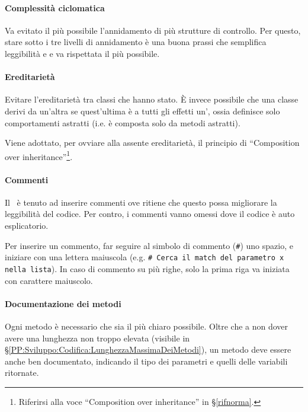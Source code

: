         \paragraph{Complessità ciclomatica}\label{PP:Sviluppo:Codifica:ComplessitàCiclomatica}
		Va evitato il più possibile l'annidamento di più strutture di controllo. Per questo, stare sotto i tre livelli di annidamento è una buona
		prassi che semplifica leggibilità e  e va rispettata il più possibile.


		\paragraph{Ereditarietà}\label{PP:Sviluppo:Codifica:Ereditarietà}
		Evitare l'ereditarietà tra classi che hanno stato. È invece possibile che una classe derivi da un'altra se quest'ultima è a tutti gli
		effetti un', ossia definisce solo comportamenti astratti (i.e. è composta solo da metodi astratti).\par
		Viene adottato, per ovviare alla assente ereditarietà, il principio di ``Composition over inheritance''\footnote{Riferirsi alla voce %
		``Composition over inheritance'' in \S\ref{rifnorma}.}.


        \paragraph{Commenti}\label{PP:Sviluppo:Codifica:Commenti}
		Il \Progr\ è tenuto ad inserire commenti ove ritiene che questo possa migliorare la leggibilità del codice. Per contro, i commenti vanno
		omessi dove il codice è auto esplicatorio.\par
		Per inserire un commento, far seguire al simbolo di commento (\texttt{\#}) uno spazio, e iniziare con una lettera maiuscola (e.g.
		\texttt{\#\ Cerca il match del parametro x nella lista}). In caso di commento su più righe, solo la prima riga va iniziata con carattere
		maiuscolo.

        \paragraph{Documentazione dei metodi}\label{PP:Sviluppo:Codifica:DocumentazioneDeiMetodi}
        Ogni metodo è necessario che sia il più chiaro possibile. Oltre che a non dover avere una lunghezza non troppo elevata (visibile in \S\ref{PP:Sviluppo:Codifica:LunghezzaMassimaDeiMetodi}), un metodo deve essere anche ben documentato, indicando il tipo dei parametri e quelli delle variabili ritornate.


